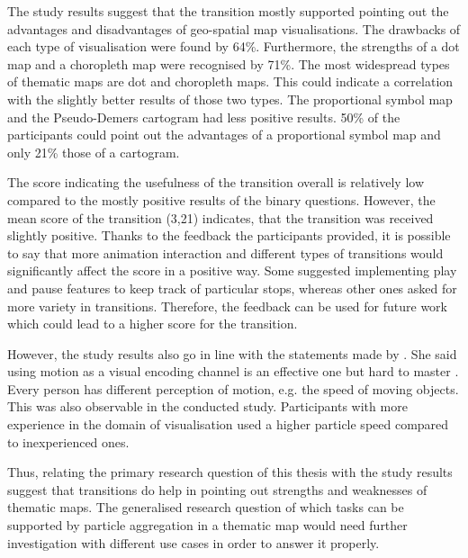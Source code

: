 \cbstart
The study results suggest that the transition mostly supported pointing out the advantages and disadvantages of geo-spatial map visualisations. The drawbacks of each type of visualisation were found by 64\%. Furthermore, the strengths of a dot map and a choropleth map were recognised by 71\%. The most widespread types of thematic maps are dot and choropleth maps. This could indicate a correlation with the slightly better results of those two types. The proportional symbol map and the Pseudo-Demers cartogram had less positive results. 50\% of the participants could point out the advantages of a proportional symbol map and only 21\% those of a cartogram.
\cbend

The score indicating the usefulness of the transition overall is relatively low compared to the mostly positive results of the binary questions. However, the mean score of the transition (3,21) indicates, that the transition was received slightly positive. Thanks to the feedback the participants provided, it is possible to say that more animation interaction and different types of transitions would significantly affect the score in a positive way. Some suggested implementing play and pause features to keep track of particular stops, whereas other ones asked for more variety in transitions. Therefore, the feedback can be used for future work which could lead to a higher score for the transition.

However, the study results also go in line with the statements made by \citeauthor{Munzner2014}. She said using motion as a visual encoding channel is an effective one but hard to master . Every person has different perception of motion, e.g. the speed of moving objects. This was also observable in the conducted study. Participants with more experience in the domain of visualisation used a higher particle speed compared to inexperienced ones.

Thus, relating the primary research question of this thesis with the study results suggest that transitions do help in pointing out strengths and weaknesses of thematic maps. The generalised research question of which tasks can be supported by particle aggregation in a thematic map would need further investigation with different use cases in order to answer it properly.